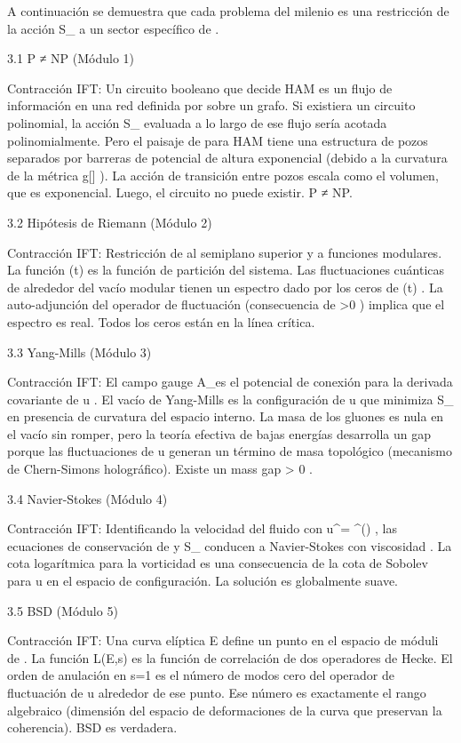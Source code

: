 \documentclass[12pt,a4paper]{book}
\begin{document}
A continuación se demuestra que cada problema del milenio es una restricción de la acción  S_{}  a un sector específico de  \rho .

3.1 P ≠ NP (Módulo 1)

Contracción IFT: Un circuito booleano que decide HAM es un flujo de información en una red definida por  \rho  sobre un grafo. Si existiera un circuito polinomial, la acción  S_{}  evaluada a lo largo de ese flujo sería acotada polinomialmente. Pero el paisaje de  \rho  para HAM tiene una estructura de pozos separados por barreras de potencial de altura exponencial (debido a la curvatura de la métrica  g[\rho] ). La acción de transición entre pozos escala como el volumen, que es exponencial. Luego, el circuito no puede existir. P ≠ NP.

3.2 Hipótesis de Riemann (Módulo 2)

Contracción IFT: Restricción de    al semiplano superior y  \rho  a funciones modulares. La función  \Xi(t)  es la función de partición del sistema. Las fluctuaciones cuánticas de  \rho  alrededor del vacío modular tienen un espectro dado por los ceros de  \Xi(t) . La auto-adjunción del operador de fluctuación (consecuencia de  \rho>0 ) implica que el espectro es real. Todos los ceros están en la línea crítica.

3.3 Yang-Mills (Módulo 3)

Contracción IFT: El campo gauge  A_\mu  es el potencial de conexión para la derivada covariante de  u . El vacío de Yang-Mills es la configuración de  u  que minimiza  S_{}  en presencia de curvatura del espacio interno. La masa de los gluones es nula en el vacío sin romper, pero la teoría efectiva de bajas energías desarrolla un gap porque las fluctuaciones de  u  generan un término de masa topológico (mecanismo de Chern-Simons holográfico). Existe un mass gap  \Delta > 0 .

3.4 Navier-Stokes (Módulo 4)

Contracción IFT: Identificando la velocidad del fluido con  u^\mu = \partial^\mu \arg(\rho) , las ecuaciones de conservación de  \rho  y  S_{}  conducen a Navier-Stokes con viscosidad  \nu \propto \hbar . La cota logarítmica para la vorticidad es una consecuencia de la cota de Sobolev para  u  en el espacio de configuración. La solución es globalmente suave.

3.5 BSD (Módulo 5)

Contracción IFT: Una curva elíptica  E  define un punto en el espacio de móduli de  \rho . La función  L(E,s)  es la función de correlación de dos operadores de Hecke. El orden de anulación en  s=1  es el número de modos cero del operador de fluctuación de  u  alrededor de ese punto. Ese número es exactamente el rango algebraico (dimensión del espacio de deformaciones de la curva que preservan la coherencia). BSD es verdadera.
\end{document}
